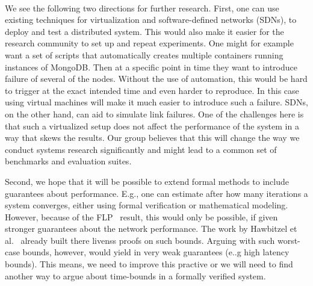 \paragraph{}
We see the following two directions for further research. First, one can use existing techniques for virtualization and software-defined networks (SDNs), to deploy and test a distributed system. This would also make it easier for the research community to set up and repeat experiments.
One might for example want a set of scripts that automatically creates multiple containers running instances of MongoDB. Then at a specific point in time they want to introduce failure of several of the nodes. Without the use of automation, this would be hard to trigger at the exact intended time and even harder to reproduce. In this case using virtual machines will make it much easier to introduce such a failure. SDNs, on the other hand, can aid to simulate link failures.
One of the challenges here is that such a virtualized setup does not affect the performance of the system in a way that skews the results.
Our group believes that this will change the way we conduct systems research significantly and might lead to a common set of benchmarks and evaluation suites.

Second, we hope that it will be possible to extend formal methods to include guarantees about performance. E.g., one can estimate after how many iterations a system converges, either using formal verification or mathematical modeling.
However, because of the FLP~\cite{fischer1985impossibility} result, this would only be possible, if given stronger guarantees about the network performance. 
The work by Hawbitzel et al.~\cite{hawblitzel2015ironfleet} already built there livenss proofs on such bounds. Arguing with such worst-case bounds, however, would yield in very weak guarantees (e..g high latency bounds). This means, we need to improve this practive or we will need to find another way to argue about time-bounds in a formally verified system.